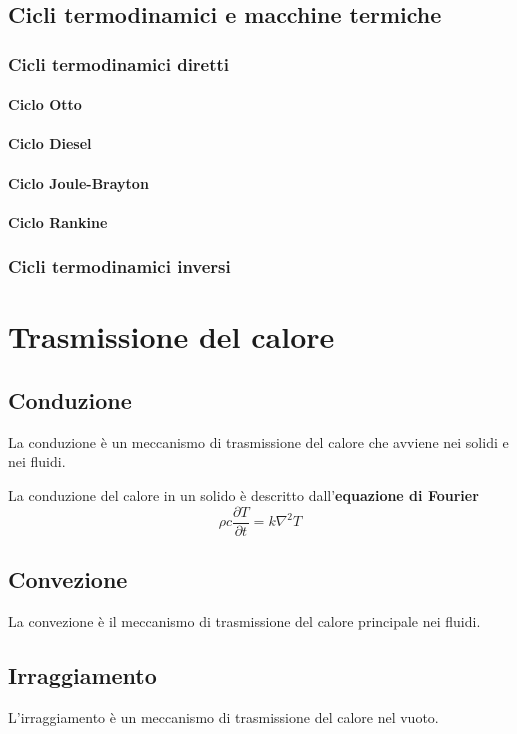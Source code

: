 \section{Cicli termodinamici e macchine termiche}
\subsection{Cicli termodinamici diretti}
\subsubsection{Ciclo Otto}
\subsubsection{Ciclo Diesel}
\subsubsection{Ciclo Joule-Brayton}
\subsubsection{Ciclo Rankine}
\subsection{Cicli termodinamici inversi}

\chapter{Trasmissione del calore}\label{ch:heat-transmission}
\section{Conduzione}
La conduzione è un meccanismo di trasmissione del calore che avviene nei solidi e nei fluidi.

\noindent
La conduzione del calore in un solido è descritto dall'\textbf{equazione di Fourier}
\begin{equation}
    \rho c \dfrac{\partial T}{\partial t} = k \nabla^2 T
\end{equation}
\section{Convezione}
La convezione è il meccanismo di trasmissione del calore principale nei fluidi.
\section{Irraggiamento}
L'irraggiamento è un meccanismo di trasmissione del calore nel vuoto.
